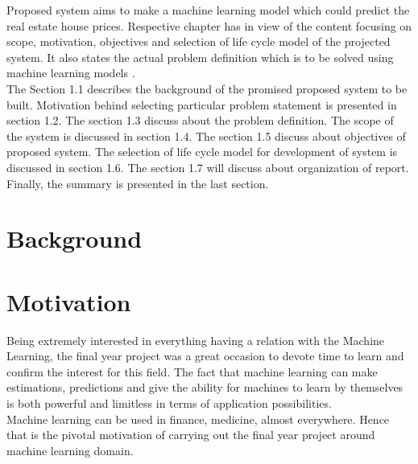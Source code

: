 
Proposed system aims to make a machine learning model which could predict the real estate house prices. Respective chapter has in view of the content focusing on scope, motivation, objectives and selection of life cycle model of the projected system. It also states the actual problem definition which is to be solved using machine learning models .\\
The Section 1.1 describes the background of the promised proposed system to be built. Motivation behind selecting particular problem statement is presented in section 1.2. The section 1.3 discuss about the problem definition. The scope of the system is discussed in section 1.4. The section 1.5 discuss about objectives of proposed system. The selection of life cycle model for development of system is discussed in section 1.6. The section 1.7 will discuss about organization of report. Finally, the summary is presented in the last section.

\section{Background}

\section{Motivation}
Being extremely interested in everything having a relation with the Machine Learning, the final year project was a great occasion to devote time to learn and confirm the interest for this field. The fact that machine learning can make estimations, predictions and give the ability for machines to learn by themselves is both powerful and limitless in terms of application possibilities.\\
Machine learning can be used in finance, medicine, almost everywhere. Hence that is the pivotal motivation of carrying out the final year project around machine learning domain.




